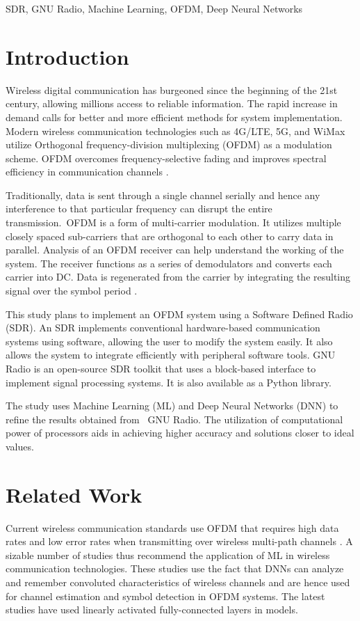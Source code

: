 \documentclass[conference]{IEEEtran}
\begin{document}
\begin{IEEEkeywords}
SDR, GNU Radio, Machine Learning, OFDM, Deep Neural Networks
\end{IEEEkeywords}

\section{Introduction}

Wireless digital communication has burgeoned since the beginning of the 21st century, allowing millions access to reliable information. The rapid increase in demand calls for better and more efficient methods for system implementation. Modern wireless communication technologies such as 4G/LTE, 5G, and WiMax \cite{b1} utilize Orthogonal frequency-division multiplexing (OFDM) as a modulation scheme. OFDM overcomes frequency-selective fading and improves spectral efficiency in communication channels \cite{b2}.

Traditionally, data is sent through a single channel serially and hence any interference to that particular frequency can disrupt the entire transmission. OFDM is a form of multi-carrier modulation. It utilizes multiple closely spaced sub-carriers that are orthogonal to each other to carry data in parallel. Analysis of an OFDM receiver can help understand the working of the system. The receiver functions as a series of demodulators and converts each carrier into DC. Data is regenerated from the carrier by integrating the resulting signal over the symbol period \cite{b3}.

This study plans to implement an OFDM system using a Software Defined Radio (SDR). An SDR implements conventional hardware-based communication systems using software, allowing the user to modify the system easily. It also allows the system to integrate efficiently with peripheral software tools. GNU Radio is an open-source SDR toolkit that uses a block-based interface to implement signal processing systems. It is also available as a Python library.

The study uses Machine Learning (ML) and Deep Neural Networks (DNN) to refine the results obtained from  GNU Radio. The utilization of computational power of processors aids in achieving higher accuracy and solutions closer to ideal values. 

\section{Related Work}
Current wireless communication standards use OFDM that requires high data rates and low error rates when transmitting over wireless multi-path channels \cite{b1}. A sizable number of studies thus recommend the application of ML in wireless communication technologies. These studies use the fact that DNNs can analyze and remember convoluted characteristics of wireless channels and are hence used for channel estimation \cite{b2} and symbol detection \cite{b4} \cite{b5} in OFDM systems. The latest studies have used linearly activated fully-connected layers \cite{b4} in models.
\end{document}

